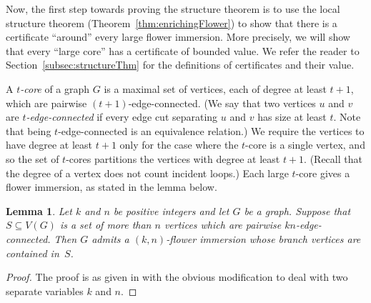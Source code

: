 \documentclass[11pt]{article}
\newtheorem{lemma}[thm]{Lemma}
\theoremstyle{definition}
\begin{document}




Now, the first step towards proving the structure theorem is to use the local structure theorem (Theorem~\ref{thm:enrichingFlower}) to show that there is a certificate ``around'' every large flower immersion. More precisely, we will show that every ``large core'' has a certificate of bounded value. We refer the reader to Section~\ref{subsec:structureThm} for the definitions of certificates and their value.

A \textit{$t$-core} of a graph $G$ is a maximal set of vertices, each of degree at least $t+1$, which are pairwise $(t+1)$-edge-connected. (We say that two vertices $u$ and $v$ are \emph{$t$-edge-connected} if every edge cut separating $u$ and $v$ has size at least $t$. Note that being $t$-edge-connected is an equivalence relation.) We require the vertices to have degree at least $t+1$ only for the case where the $t$-core is a single vertex, and so the set of $t$-cores partitions the vertices with degree at least $t+1$. (Recall that the degree of a vertex does not count incident loops.) Each large $t$-core gives a flower immersion, as stated in the lemma below.

\begin{lemma}
\label{lem:TcoreGivesFlower}
    Let $k$ and $n$ be positive integers and let $G$ be a graph. Suppose that $S \subseteq V(G)$ is a set of more than $n$ vertices which are pairwise $kn$-edge-connected. Then $G$ admits a $(k,n)$-flower immersion whose branch vertices are contained in~$S$.
\end{lemma}
\begin{proof}
    The proof is as given in \cite[Lemma~1]{WOLLAN2015} with the obvious modification to deal with two separate variables $k$ and $n$.
\end{proof}
\end{document}
